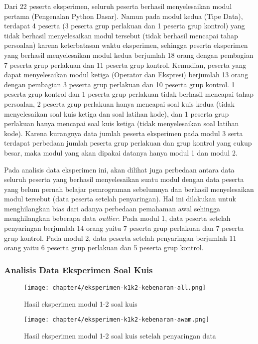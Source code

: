 Dari 22 peserta eksperimen, seluruh peserta berhasil menyelesaikan modul pertama (Pengenalan Python Dasar). Namun pada modul kedua (Tipe Data), terdapat 4 peserta (3 peserta grup perlakuan dan 1 peserta grup kontrol) yang tidak berhasil menyelesaikan modul tersebut (tidak berhasil mencapai tahap persoalan) karena keterbatasan waktu eksperimen, sehingga peserta eksperimen yang berhasil menyelesaikan modul kedua berjumlah 18 orang dengan pembagian 7 peserta grup perlakuan dan 11 peserta grup kontrol. Kemudian, peserta yang dapat menyelesaikan modul ketiga (Operator dan Ekspresi) berjumlah 13 orang dengan pembagian 3 peserta grup perlakuan dan 10 peserta grup kontrol. 1 peserta grup kontrol dan 1 peserta grup perlakuan tidak berhasil mencapai tahap persoalan, 2 peserta grup perlakuan hanya mencapai soal kuis kedua (tidak menyelesaikan soal kuis ketiga dan soal latihan kode), dan 1 peserta grup perlakuan hanya mencapai soal kuis ketiga (tidak menyelesaikan soal latihan kode). Karena kurangnya data jumlah peserta eksperimen pada modul 3 serta terdapat perbedaan jumlah peserta grup perlakuan dan grup kontrol yang cukup besar, maka modul yang akan dipakai datanya hanya modul 1 dan modul 2.

Pada analisis data eksperimen ini, akan dilihat juga perbedaan antara data seluruh peserta yang berhasil menyelesaikan suatu modul dengan data peserta yang belum pernah belajar pemrograman sebelumnya dan berhasil menyelesaikan modul tersebut (data peserta setelah penyaringan). Hal ini dilakukan untuk menghilangkan bias dari adanya perbedaan pemahaman awal sehingga menghilangkan beberapa data \textit{outlier}. Pada modul 1, data peserta setelah penyaringan berjumlah 14 orang yaitu 7 peserta grup perlakuan dan 7 peserta grup kontrol. Pada modul 2, data peserta setelah penyaringan berjumlah 11 orang yaitu 6 peserta grup perlakuan dan 5 peserta grup kontrol.


\subsubsection{Analisis Data Eksperimen Soal Kuis}
\begin{figure}[H]
  \centering
  \texttt{[image: chapter4/eksperimen-k1k2-kebenaran-all.png]}
  \caption{Hasil eksperimen modul 1-2 soal kuis} \label{fig:eksperimen-k1k2-kebenaran-all}
\end{figure}
\begin{figure}[H]
  \centering
  \texttt{[image: chapter4/eksperimen-k1k2-kebenaran-awam.png]}
  \caption{Hasil eksperimen modul 1-2 soal kuis setelah penyaringan data} \label{fig:eksperimen-k1k2-kebenaran-awam}
\end{figure}

